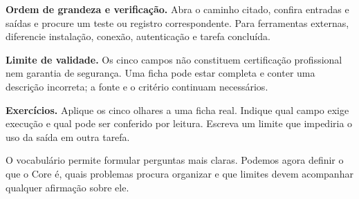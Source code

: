 \begin{resultado}
\textbf{Ordem de grandeza e verificação.} Abra o caminho citado, confira entradas e saídas e procure um teste ou registro correspondente. Para ferramentas externas, diferencie instalação, conexão, autenticação e tarefa concluída.
\end{resultado}

\begin{aviso}
\textbf{Limite de validade.} Os cinco campos não constituem certificação profissional nem garantia de segurança. Uma ficha pode estar completa e conter uma descrição incorreta; a fonte e o critério continuam necessários.
\end{aviso}

\begin{resultado}
\textbf{Exercícios.} Aplique os cinco olhares a uma ficha real. Indique qual campo exige execução e qual pode ser conferido por leitura. Escreva um limite que impediria o uso da saída em outra tarefa.
\end{resultado}

O vocabulário permite formular perguntas mais claras. Podemos agora definir o que o Core é, quais problemas procura organizar e que limites devem acompanhar qualquer afirmação sobre ele.
